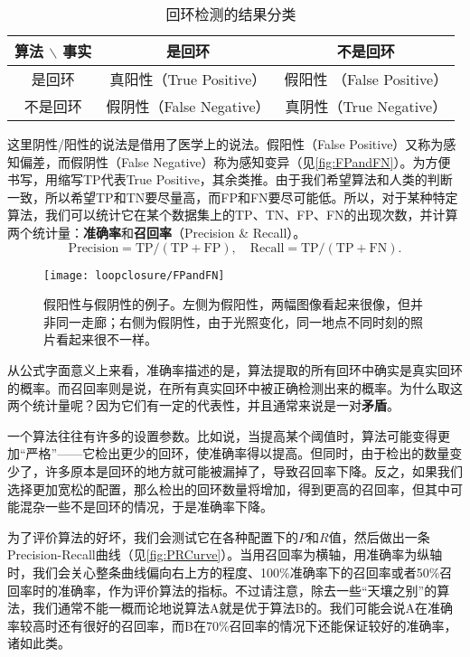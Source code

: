\begin{table}[!htp]
\centering
\caption{回环检测的结果分类}
\label{table:loopclosure}
\begin{tabu}{c|c|c}
	\toprule
	算法 $\backslash$ 事实 & 是回环 & 不是回环 \\ 
	\midrule
	是回环 & 真阳性（True Positive） & 假阳性 （False Positive） \\ 
	不是回环 & 假阴性（False Negative） & 真阴性（True Negative） \\ 
	\bottomrule
\end{tabu} 
\end{table}

这里阴性/阳性的说法是借用了医学上的说法。假阳性（False  Positive）又称为感知偏差，而假阴性（False Negative）称为感知变异（见\autoref{fig:FPandFN}）。为方便书写，用缩写TP代表True Positive，其余类推。由于我们希望算法和人类的判断一致，所以希望TP和TN要尽量高，而FP和FN要尽可能低。所以，对于某种特定算法，我们可以统计它在某个数据集上的TP、TN、FP、FN的出现次数，并计算两个统计量：\textbf{准确率}和\textbf{召回率}（Precision \& Recall）。
\begin{equation}
\mathrm{Precision} = \mathrm{TP}/(\mathrm{TP}+\mathrm{FP}), \quad \mathrm{Recall} = \mathrm{TP}/(\mathrm{TP}+\mathrm{FN}).
\end{equation}

\vspace{-\medskipamount}
\begin{figure}[!htp]
	\centering
	\texttt{[image: loopclosure/FPandFN]}
	\caption{假阳性与假阴性的例子。左侧为假阳性，两幅图像看起来很像，但并非同一走廊；右侧为假阴性，由于光照变化，同一地点不同时刻的照片看起来很不一样。}
	\label{fig:FPandFN}
\end{figure}

从公式字面意义上来看，准确率描述的是，算法提取的所有回环中确实是真实回环的概率。而召回率则是说，在所有真实回环中被正确检测出来的概率。为什么取这两个统计量呢？因为它们有一定的代表性，并且通常来说是一对\textbf{矛盾}。

一个算法往往有许多的设置参数。比如说，当提高某个阈值时，算法可能变得更加“严格”——它检出更少的回环，使准确率得以提高。但同时，由于检出的数量变少了，许多原本是回环的地方就可能被漏掉了，导致召回率下降。反之，如果我们选择更加宽松的配置，那么检出的回环数量将增加，得到更高的召回率，但其中可能混杂一些不是回环的情况，于是准确率下降。

为了评价算法的好坏，我们会测试它在各种配置下的$P$和$R$值，然后做出一条Precision-Recall曲线（见\autoref{fig:PRCurve}）。当用召回率为横轴，用准确率为纵轴时，我们会关心整条曲线偏向右上方的程度、100\%准确率下的召回率或者50\%召回率时的准确率，作为评价算法的指标。不过请注意，除去一些“天壤之别”的算法，我们通常不能一概而论地说算法A就是优于算法B的。我们可能会说A在准确率较高时还有很好的召回率，而B在70\%召回率的情况下还能保证较好的准确率，诸如此类。

